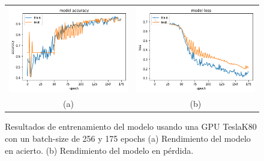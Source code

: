 \begin{figure}
    \centering
    \begin{tabular}{cc}
        \includegraphics[height=0.35\textwidth]{images/chapter5/batch_256_175_epoch.png} &
        \includegraphics[height=0.35\textwidth]{images/chapter5/batch_256_175_epoch_loss.png}\\
        (a) & (b)\\
    \end{tabular}
    \label{fig:Resultados de entrenamiento con un batch-size de 256 y 175 epochs}
    \caption{Resultados de entrenamiento del modelo usando una GPU TeslaK80 con un batch-size de 256 y 175 epochs (a) Rendimiento del modelo en acierto. (b) Rendimiento del modelo en pérdida.}
\end{figure}

